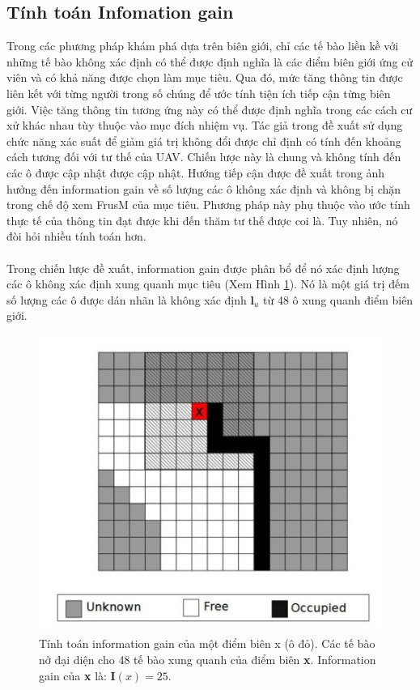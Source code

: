 \documentclass[11pt,openany]{book}
\begin{document}
\subsection{Tính toán Infomation gain}
Trong các phương pháp khám phá dựa trên biên giới, chỉ các tế bào liền kề với những tế bào không xác định có thể được định nghĩa là các điểm biên giới ứng cử viên và có khả năng được chọn làm mục tiêu. Qua đó, mức tăng thông tin được liên kết với từng người trong số chúng để ước tính tiện ích tiếp cận từng biên giới. Việc tăng thông tin tương ứng này có thể được định nghĩa trong các cách cư xử khác nhau tùy thuộc vào mục đích nhiệm vụ. Tác giả trong \cite{burgard2005coordinated} đề xuất sử dụng chức năng xác suất để giảm giá trị không đổi được chỉ định có tính đến khoảng cách tương đối với tư thế của UAV. Chiến lược này là chung và không tính đến các ô được cập nhật được cập nhật. Hướng tiếp cận được đề xuất trong \cite{heng2015efficient} ảnh hưởng đến information gain về số lượng các ô không xác định và không bị chặn trong chế độ xem FrusM của mục tiêu. Phương pháp này phụ thuộc vào ước tính thực tế của thông tin đạt được khi đến thăm tư thế được coi là. Tuy nhiên, nó đòi hỏi nhiều tính toán hơn.\\\\
Trong chiến lược đề xuất, information gain được phân bổ để nó xác định lượng các ô không xác định xung quanh mục tiêu (Xem Hình \ref{fig:3.4}). Nó là một giá trị đếm số lượng các ô được dán nhãn là không xác định $\mathbf{l}_u$ từ 48 ô xung quanh điểm biên giới.
\begin{figure}[H]
    \centering
    \includegraphics[scale=0.4]{assets/3_4.png}
    \caption{Tính toán information gain của một điểm biên x (ô đỏ). Các tế bào nở đại diện cho 48 tế bào xung quanh của điểm biên \textbf{x}. Information gain của \textbf{x} là: $\mathbf{I}(x)=25$.}
    \label{fig:3.4}
\end{figure}
\end{document}
